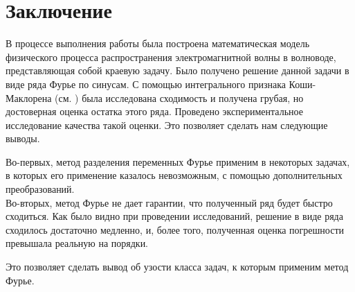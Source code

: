 \chapter*{Заключение}

В процессе выполнения работы была построена математическая модель физического процесса
распространения электромагнитной волны в волноводе, представляющая собой краевую задачу.
Было получено решение данной задачи в виде ряда Фурье по синусам. С помощью интегрального признака
Коши-Маклорена (см. \cite{sendov}) была исследована сходимость и получена грубая, но 
достоверная оценка остатка этого ряда. Проведено экспериментальное исследование качества такой оценки.
Это позволяет сделать нам следующие выводы.

Во-первых, метод разделения переменных Фурье применим в некоторых задачах, в которых его применение казалось
невозможным, с помощью дополнительных преобразований.\\
Во-вторых, метод Фурье не дает гарантии, что полученный ряд будет быстро сходиться. Как было видно при проведении
исследований, решение в виде ряда сходилось достаточно медленно, и, более того, полученная оценка погрешности
превышала реальную на порядки.

Это позволяет сделать вывод об узости класса задач, к которым применим метод Фурье.

